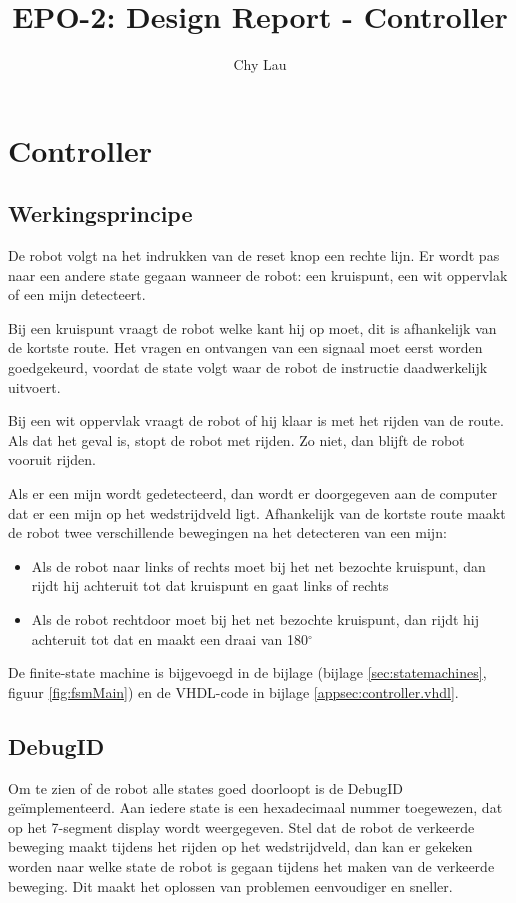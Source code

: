 \documentclass{report}
\title{EPO-2: Design Report - Controller}
\author{Chy Lau}
\begin{document}
\chapter{Controller}
\label{ch:controller}

\section{Werkingsprincipe}
De robot volgt na het indrukken van de reset knop een rechte lijn.
Er wordt pas naar een andere state gegaan wanneer de robot: een kruispunt, een wit oppervlak of een mijn detecteert.


Bij een kruispunt vraagt de robot welke kant hij op moet, dit is afhankelijk van de kortste route.
Het vragen en ontvangen van een signaal moet eerst worden goedgekeurd, voordat de state volgt waar de robot de instructie daadwerkelijk uitvoert.

Bij een wit oppervlak vraagt de robot of hij klaar is met het rijden van de route.
Als dat het geval is, stopt de robot met rijden.
Zo niet, dan blijft de robot vooruit rijden.

Als er een mijn wordt gedetecteerd, dan wordt er doorgegeven aan de computer dat er een mijn op het wedstrijdveld ligt. 
Afhankelijk van de kortste route maakt de robot twee verschillende bewegingen na het detecteren van een mijn:
\begin{itemize}
\item Als de robot naar links of rechts moet bij het net bezochte kruispunt, dan rijdt hij achteruit tot dat kruispunt en gaat links of rechts
\item Als de robot rechtdoor moet bij het net bezochte kruispunt, dan rijdt hij achteruit tot dat en maakt een draai van 180$^\circ$
\end{itemize}

De finite-state machine is bijgevoegd in de bijlage (bijlage \ref{sec:statemachines}, figuur \ref{fig:fsmMain}) en de VHDL-code in bijlage \ref{appsec:controller.vhdl}.

\section{DebugID}
Om te zien of de robot alle states goed doorloopt is de DebugID geïmplementeerd.
Aan iedere state is een hexadecimaal nummer toegewezen, dat op het 7-segment display wordt weergegeven.
Stel dat de robot de verkeerde beweging maakt tijdens het rijden op het wedstrijdveld, dan kan er gekeken worden naar welke state de robot is gegaan tijdens het maken van de verkeerde beweging.
Dit maakt het oplossen van problemen eenvoudiger en sneller.
\end{document}
